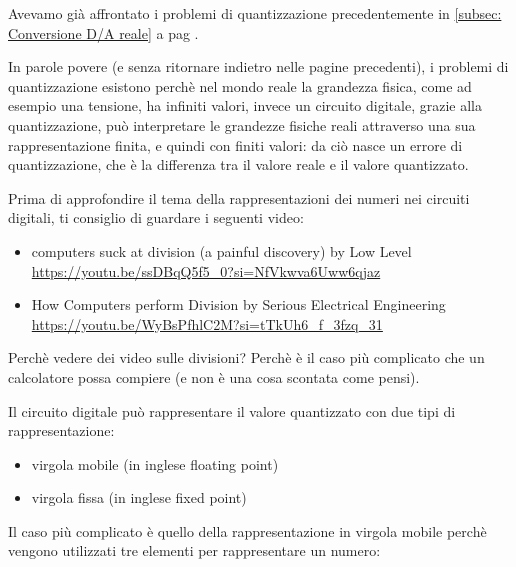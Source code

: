 Avevamo già affrontato i problemi di quantizzazione precedentemente in \ref{subsec: Conversione D/A reale}  a pag \pageref{subsec: Conversione D/A reale}. \newline 

In parole povere (e senza ritornare indietro nelle pagine precedenti), i problemi di quantizzazione esistono perchè nel mondo reale la grandezza fisica, come ad esempio una tensione, ha infiniti valori, 
invece un circuito digitale, grazie alla quantizzazione, può interpretare le grandezze fisiche reali attraverso una sua rappresentazione finita, e quindi con finiti valori: da ciò nasce un errore di quantizzazione, che è la differenza tra il valore reale e il valore quantizzato. \newline 

\begin{tcolorbox}
    Prima di approfondire il tema della rappresentazioni dei numeri nei circuiti digitali, ti consiglio di guardare i seguenti video: 

    \begin{itemize}
        \item computers suck at division (a painful discovery) by Low Level \\\url{https://youtu.be/ssDBqQ5f5_0?si=NfVkwva6Uww6qjaz} 
        \item How Computers perform Division by Serious Electrical Engineering \\\url{https://youtu.be/WyBsPfhlC2M?si=tTkUh6_f_3fzq_31}
    \end{itemize}

    Perchè vedere dei video sulle divisioni? Perchè è il caso più complicato che un calcolatore possa compiere (e non è una cosa scontata come pensi). 
\end{tcolorbox} 

Il circuito digitale può rappresentare il valore quantizzato con due tipi di rappresentazione: 

\begin{itemize}
    \item virgola mobile (in inglese floating point) 
    \item virgola fissa (in inglese fixed point)
\end{itemize} 

\newpage 

Il caso più complicato è quello della rappresentazione in virgola mobile perchè vengono utilizzati tre elementi per rappresentare un numero: 

